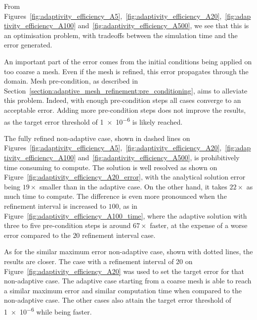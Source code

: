 From
Figures~\ref{fig:adaptivity_efficiency_A5},~\ref{fig:adaptivity_efficiency_A20},~\ref{fig:adaptivity_efficiency_A100}
and~\ref{fig:adaptivity_efficiency_A500}, we see that this is an optimisation problem, with
tradeoffs between the simulation time and the error generated.

An important part of the error comes from the initial conditions being applied on too coarse a mesh.
Even if the mesh is refined, this error propagates through the domain. Mesh pre-condition, as
described in Section~\ref{section:adaptive_mesh_refinement:pre_conditioning}, aims to alleviate this
problem. Indeed, with enough pre-condition steps all cases converge to an acceptable error. Adding
more pre-condition steps does not improve the results, as the target error threshold of \num{1e-6}
is likely reached.

The fully refined non-adaptive case, shown in dashed lines on
Figures~\ref{fig:adaptivity_efficiency_A5},~\ref{fig:adaptivity_efficiency_A20},~\ref{fig:adaptivity_efficiency_A100}
and~\ref{fig:adaptivity_efficiency_A500}, is prohibitively time consuming to compute. The solution
is well resolved as shown on Figure~\ref{fig:adaptivity_efficiency_A20_error}, with the analytical
solution error being \(19 \times \) smaller than in the adaptive case. On the other hand, it takes
\(22 \times \) as much time to compute. The difference is even more pronounced when the refinement
interval is increased to \(100\), as in Figure~\ref{fig:adaptivity_efficiency_A100_time}, where the
adaptive solution with three to five pre-condition steps is around \(67 \times \) faster, at the
expense of a worse error compared to the \(20\) refinement interval case.

As for the similar maximum error non-adaptive case, shown with dotted lines, the results are closer.
The case with a refinement interval of 20 on Figure~\ref{fig:adaptivity_efficiency_A20} was used to
set the target error for that non-adaptive case. The adaptive case starting from a coarse mesh is
able to reach a similar maximum error and similar computation time when compared to the non-adaptive
case. The other cases also attain the target error threshold of \num{1e-6} while being faster.

